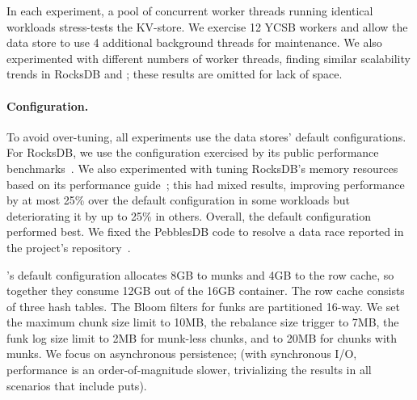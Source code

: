 In each experiment, a pool of concurrent worker threads running identical
workloads stress-tests the KV-store. We exercise 12 YCSB workers 
and allow the data store to use 4 additional background threads for maintenance.
We also experimented with different numbers of worker threads, finding similar scalability trends in RocksDB and 
\sys; these results are omitted for lack of space.







\paragraph{Configuration.} 
To avoid over-tuning, all experiments use the data stores' default configurations. For RocksDB, we use the configuration exercised by its public 
performance benchmarks~\cite{RocksDBPerf}. 
We also experimented with tuning RocksDB's memory resources based on its performance guide~\cite{RocksDBMemoryTuning}; 
this had mixed results, improving performance by at most 25\% over the default configuration in some workloads but 
deteriorating it by up to 25\% in others. Overall, the default configuration performed best. 
We fixed the PebblesDB code to resolve a data race reported in the project's repository~\cite{pebbles-git-issue}. 

\sys's default configuration 
allocates 8GB to munks and 4GB to the row cache,
so together they consume 12GB out of the 16GB container. 
The row cache consists of three hash tables.  
The Bloom filters for funks are partitioned 16-way.  
We set the \sys\/ maximum chunk size limit to 10MB, the rebalance size trigger to 7MB, 
the funk log size limit to 2MB for munk-less chunks, and to 20MB for chunks with munks. 
We focus on  asynchronous persistence; (with synchronous I/O, performance is
an order-of-magnitude slower, trivializing the results in all scenarios that include puts). 


